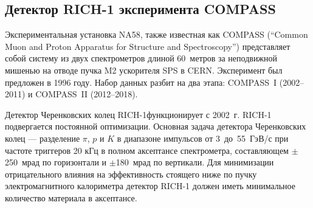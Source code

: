 \subsection{Детектор RICH-1 эксперимента COMPASS}\label{sec:CompassRich1}



Экспериментальная установка NA58, также известная как COMPASS (``Common Muon and Proton Apparatus for Structure and Spectroscopy'') представляет собой систему из двух спектрометров длиной 60~метров за неподвижной мишенью на отводе пучка M2 ускорителя SPS в CERN. Эксперимент был предложен в 1996 году. Набор данных разбит на два этапа: \mbox{COMPASS I} (2002--2011) и \mbox{COMPASS II} (2012--2018).




Детектор Черенковских колец \mbox{RICH-1}функционирует с 2002~г. \mbox{RICH-1} подвергается постоянной оптимизации.
Основная задача детектора Черенковских колец --- разделение $\pi$, $p$ и $K$ в диапазоне импульсов от 3~до~55~ГэВ/с при частоте триггеров 20 кГц в полном аксептансе спектрометра, составляющем $\pm$250~мрад по горизонтали и $\pm$180~мрад по вертикали. Для минимизации отрицательного влияния на эффективность стоящего ниже по пучку электромагнитного калориметра детектор \mbox{RICH-1} должен иметь минимальное количество материала в аксептансе.

